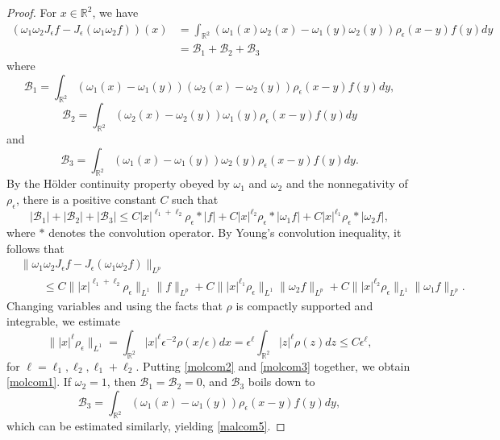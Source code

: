 \documentclass[10pt,a4paper]{amsart}
\newcommand{\R}{\mathbb R}
\newcommand{\be}{\begin{equation}}
\newcommand{\ee}{\end{equation}}
\begin{document}
\begin{proof}
For $x \in \R^2$, we have 
\be 
\begin{aligned}
(\omega_1 \omega_2 J_{\epsilon}f - J_{\epsilon}(\omega_1 \omega_2 f))(x)
&= \int_{\R^2} (\omega_1(x) \omega_2(x) - \omega_1(y) \omega_2(y)) \rho_{\epsilon}(x-y) f(y) dy 
\\&= \mathcal{B}_1 + \mathcal{B}_2 + \mathcal{B}_3
\end{aligned}
\ee where 
\be 
\mathcal{B}_1 = \int_{\R^2} (\omega_1(x) - \omega_1(y)) (\omega_2(x) - \omega_2(y)) \rho_{\epsilon}(x-y) f(y) dy, 
\ee 
\be 
\mathcal{B}_2 = \int_{\R^2} (\omega_2(x)- \omega_2(y)) \omega_1(y) \rho_{\epsilon}(x-y) f(y) dy 
\ee and 
\be 
\mathcal{B}_3 = \int_{\R^2} (\omega_1(x)- \omega_1(y)) \omega_2(y) \rho_{\epsilon}(x-y) f(y) dy. 
\ee By the H\"older continuity property obeyed by $\omega_1$ and $\omega_2$ and the nonnegativity of $\rho_{\epsilon}$, there is a positive constant $C$ such that 
\be 
|\mathcal{B}_1| + |\mathcal{B}_2| + |\mathcal{B}_3|
\le C |x|^{\ell_1 + \ell_2} \rho_{\epsilon} * |f| + C|x|^{\ell_2}\rho_{\epsilon} * |\omega_1 f| + C|x|^{\ell_1}\rho_{\epsilon} * |\omega_2f|,
\ee where $*$ denotes the convolution operator. By Young's convolution inequality, it follows that 
\be \label{molcom2}
\begin{aligned}
&\|\omega_1 \omega_2 J_{\epsilon}f - J_{\epsilon}(\omega_1 \omega_2 f)\|_{L^p}
\\&\quad\quad\le C\||x|^{\ell_1+ \ell_2} \rho_{\epsilon}\|_{L^1} \|f\|_{L^p}
+ C\||x|^{\ell_1} \rho_{\epsilon}\|_{L^1} \|\omega_2 f\|_{L^p}
+ 
 C\||x|^{\ell_2} \rho_{\epsilon}\|_{L^1} \|\omega_1 f\|_{L^p}.
 \end{aligned}
\ee Changing variables and using the facts that $\rho$ is compactly supported and integrable, we estimate 
\be \label{molcom3}
\||x|^{\ell} \rho_{\epsilon}\|_{L^1}
= \int_{\R^2} |x|^{\ell} \epsilon^{{-2}}\rho(x/\epsilon) dx
= \epsilon^{\ell} \int_{\R^2} |z|^{\ell} \rho(z) dz \le C\epsilon^{\ell},
\ee for $\ell = \ell_1, \ell_2, \ell_1 + \ell_2$. Putting \eqref{molcom2} and \eqref{molcom3} together, we obtain \eqref{molcom1}. If $\omega_2 = 1$, then $\mathcal{B}_1 = \mathcal{B}_2 = 0$, and $\mathcal{B}_3$ boils down to 
\be 
\mathcal{B}_3 = \int_{\R^2} (\omega_1(x) - \omega_1(y)) \rho_{\epsilon}(x-y) f(y) dy,
\ee which can be estimated similarly, yielding \eqref{malcom5}. 
\end{proof}
\end{document}

